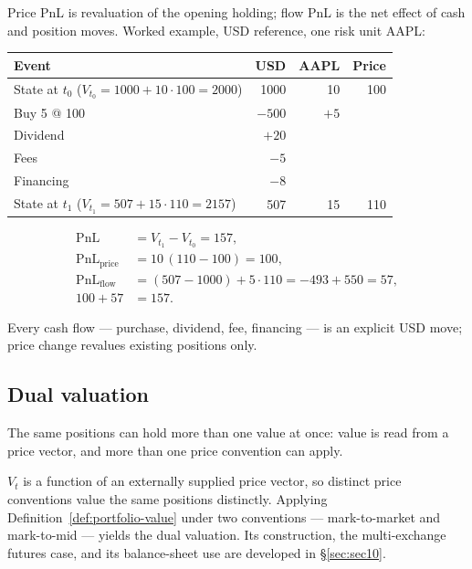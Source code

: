 \noindent Price PnL is revaluation of the opening holding; flow PnL is the net effect of cash and position moves. Worked example, USD reference, one risk unit AAPL:

\begin{center}
\begin{tabular}{l r r r}
\toprule
\textbf{Event} & \textbf{USD} & \textbf{AAPL} & \textbf{Price} \\
\midrule
State at $t_0$ \quad ($V_{t_0}=1000+10\cdot100=2000$) & 1000 & 10 & 100 \\
\midrule
Buy 5 @ 100 & $-500$ & $+5$ & \\
Dividend & $+20$ & & \\
Fees & $-5$ & & \\
Financing & $-8$ & & \\
\midrule
State at $t_1$ \quad ($V_{t_1}=507+15\cdot110=2157$) & 507 & 15 & 110 \\
\bottomrule
\end{tabular}
\end{center}

\begin{align*}
\mathrm{PnL} &= V_{t_1} - V_{t_0} = 157, \\
\mathrm{PnL}_{\text{price}} &= 10\,(110-100) = 100, \\
\mathrm{PnL}_{\text{flow}} &= (507-1000) + 5\cdot110 = -493 + 550 = 57, \\
100 + 57 &= 157.
\end{align*}

\noindent Every cash flow --- purchase, dividend, fee, financing --- is an explicit USD move; price change revalues existing positions only.

\subsection{Dual valuation}

\noindent The same positions can hold more than one value at once: value is read from a price vector, and more than one price convention can apply.

\medskip
$V_t$ is a function of an externally supplied price vector, so distinct price conventions value the same positions distinctly. Applying Definition~\ref{def:portfolio-value} under two conventions --- mark-to-market and mark-to-mid --- yields the dual valuation. Its construction, the multi-exchange futures case, and its balance-sheet use are developed in \S\ref{sec:sec10}.
